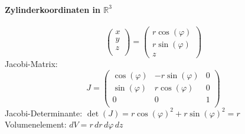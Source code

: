\documentclass[a4paper, 9pt, DIV=24]{scrartcl}
\newcommand{\R}{\mathbb{R}}
\begin{document}
\paragraph{Zylinderkoordinaten in $\R^3$}
\[
\begin{pmatrix}
 x \\ y \\ z \\
\end{pmatrix}
=
\begin{pmatrix}
 r\cos(\varphi) \\
 r\sin(\varphi) \\
 z
\end{pmatrix}
\]
Jacobi-Matrix:
\[
J =
\begin{pmatrix}
 \cos(\varphi) & -r\sin(\varphi) & 0 \\
 \sin(\varphi) &  r\cos(\varphi) & 0 \\
 0 & 0 & 1 \\
\end{pmatrix}
\]
Jacobi-Determinante: $\det(J) = r\cos(\varphi)^2+r\sin(\varphi)^2 = r$\\
Volumenelement: $dV = r\, dr\, d\varphi\, dz$
\end{document}
